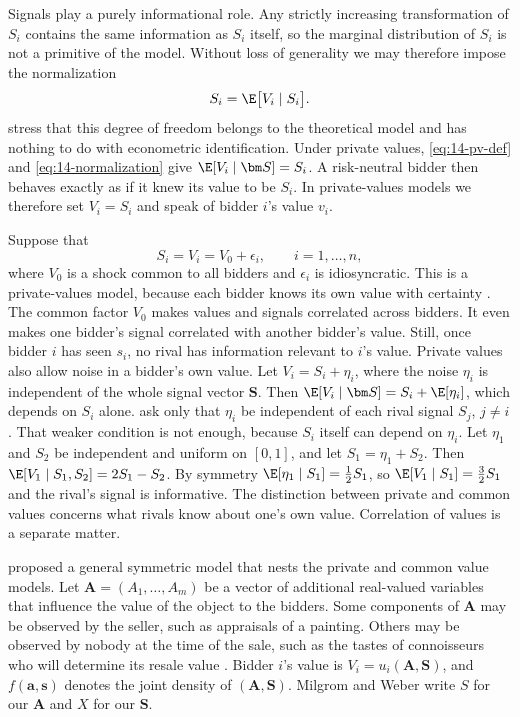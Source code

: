 Signals play a purely informational role. Any strictly increasing transformation of $S_i$ contains the same
information as $S_i$ itself, so the marginal distribution of $S_i$ is not a primitive of the model.
Without loss of generality we may therefore impose the normalization
\begin{equation}\label{eq:14-normalization}
S_i=\E\bigl[V_i\mid S_i\bigr].
\end{equation}
\citet[footnote~5]{AtheyHaile2007} stress that this degree of freedom belongs to the theoretical model and
has nothing to do with econometric identification. Under private values, \eqref{eq:14-pv-def} and
\eqref{eq:14-normalization} give $\E[V_i\mid\bm S]=S_i$. A risk-neutral bidder then behaves exactly as if
it knew its value to be $S_i$. In private-values models we therefore set $V_i=S_i$ and speak of bidder
$i$'s value $v_i$.

\begin{remark}\label{rem:14-common-factor}
Suppose that
\begin{equation}\label{eq:14-common-factor}
S_i=V_i=V_0+\epsilon_i,\qquad i=1,\dots,n,
\end{equation}
where $V_0$ is a shock common to all bidders and $\epsilon_i$ is idiosyncratic. This is a private-values
model, because each bidder knows its own value with certainty \citep[Section~7]{AtheyHaile2007}. The common
factor $V_0$ makes values and signals correlated across bidders. It even makes one bidder's signal
correlated with another bidder's value. Still, once bidder $i$ has seen $s_i$, no rival has information
relevant to $i$'s value. Private values also allow noise in a bidder's own value. Let $V_i=S_i+\eta_i$, where
the noise $\eta_i$ is independent of the whole signal vector $\bm S$. Then $\E[V_i\mid\bm S]=S_i+\E[\eta_i]$,
which depends on $S_i$ alone. \citet[footnote~78]{AtheyHaile2007} ask only that $\eta_i$ be independent of
each rival signal $S_j$, $j\neq i$. That weaker condition is not enough, because $S_i$ itself can depend on
$\eta_i$. Let $\eta_1$ and $S_2$ be independent and uniform on $[0,1]$, and let $S_1=\eta_1+S_2$. Then
$\E[V_1\mid S_1,S_2]=2S_1-S_2$. By symmetry $\E[\eta_1\mid S_1]=\frac{1}{2}S_1$, so
$\E[V_1\mid S_1]=\frac{3}{2}S_1$ and the rival's signal is informative. The distinction between private
and common values concerns
what rivals know about one's own value. Correlation of values is a separate matter.
\end{remark}

\citet{MilgromWeber1982} proposed a general symmetric model that nests the private and common value
models. Let $\bm A=(A_1,\dots,A_m)$ be a vector of additional real-valued variables that influence the value
of the object to the bidders. Some components of $\bm A$ may be observed by the seller, such as appraisals
of a painting. Others may be observed by nobody at the time of the sale, such as the tastes of
connoisseurs who will determine its resale value \citep[p.~1097]{MilgromWeber1982}. Bidder $i$'s value is
$V_i=u_i(\bm A,\bm S)$, and $f(\bm a,\bm s)$ denotes the joint density of $(\bm A,\bm S)$. Milgrom and
Weber write $S$ for our $\bm A$ and $X$ for our $\bm S$.


